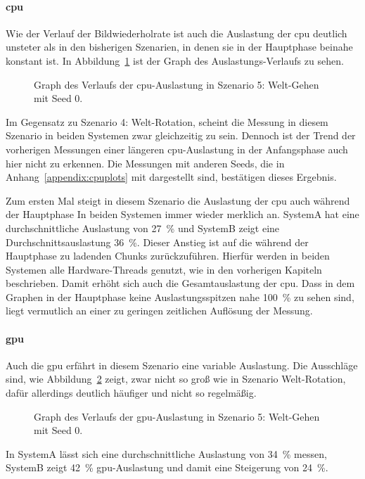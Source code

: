 \paragraph{\ac{cpu}}
Wie der Verlauf der Bildwiederholrate ist auch die Auslastung der \ac{cpu} deutlich unsteter als in den bisherigen Szenarien, in denen sie in der Hauptphase beinahe konstant ist. In Abbildung~\ref{fig:seed-0-walk-cpu} ist der Graph des Auslastungs-Verlaufs zu sehen.
\begin{figure}[!htbp]
	\caption[Graph des Verlaufs der -Auslastung in Szenario 5: Welt-Gehen mit Seed 0.]{Graph des Verlaufs der \ac{cpu}-Auslastung in Szenario 5: Welt-Gehen mit Seed 0.}\label{fig:seed-0-walk-cpu}
\end{figure}
Im Gegensatz zu Szenario 4: Welt-Rotation, scheint die Messung in diesem Szenario in beiden Systemen zwar gleichzeitig zu sein. Dennoch ist der Trend der vorherigen Messungen einer längeren \ac{cpu}-Auslastung in der Anfangsphase auch hier nicht zu erkennen. Die Messungen mit anderen Seeds, die in Anhang~\vref{appendix:cpuplots} mit dargestellt sind, bestätigen dieses Ergebnis.

Zum ersten Mal steigt in diesem Szenario die Auslastung der \ac{cpu} auch während der Hauptphase In beiden Systemen immer wieder merklich an. SystemA hat eine durchschnittliche Auslastung von \SI{27}{\percent} und SystemB zeigt eine Durchschnittsauslastung \SI{36}{\percent}. Dieser Anstieg ist auf die während der Hauptphase zu ladenden Chunks zurückzuführen. Hierfür werden in beiden Systemen alle Hardware-Threads genutzt, wie in den vorherigen Kapiteln beschrieben. Damit erhöht sich auch die Gesamtauslastung der \ac{cpu}. Dass in dem Graphen in der Hauptphase keine Auslastungsspitzen nahe \SI{100}{\percent} zu sehen sind, liegt vermutlich an einer zu geringen zeitlichen Auflösung der Messung.

\paragraph{\ac{gpu}}
Auch die \ac{gpu} erfährt in diesem Szenario eine variable Auslastung. Die Ausschläge sind, wie Abbildung~\ref{fig:seed-0-walk-gpu} zeigt, zwar nicht so groß wie in Szenario Welt-Rotation, dafür allerdings deutlich häufiger und nicht so regelmäßig.
\begin{figure}[!htbp]
	\caption[Graph des Verlaufs der -Auslastung in Szenario 5: Welt-Gehen mit Seed 0.]{Graph des Verlaufs der \ac{gpu}-Auslastung in Szenario 5: Welt-Gehen mit Seed 0.}\label{fig:seed-0-walk-gpu}
\end{figure}
In SystemA lässt sich eine durchschnittliche Auslastung von \SI{34}{\percent} messen, SystemB zeigt \SI{42}{\percent} \ac{gpu}-Auslastung und damit eine Steigerung von \SI{24}{\percent}.

